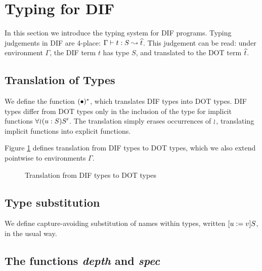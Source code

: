 \section{Typing for DIF}
\label{typing}

In this section we introduce the typing system for DIF programs. Typing
judgements in DIF are 4-place: $\Gamma \vdash t: S \leadsto \widehat{t}$. This judgement can
be read: under environment $\Gamma$, the DIF term $t$ has type $S$, and
translated to the DOT term $\widehat{t}$.

\subsection{Translation of Types}

We define the function $(\bullet)^{*}$, which translates DIF types into DOT types. DIF types differ from DOT types only in the inclusion of the type for implicit functions $\forall\!\wr\!(u:S)S'$. The translation simply erases occurrences of $\wr$, translating implicit functions into explicit functions.
\begin{DEFINITION}
    \label{translation}
    Figure \ref{figure_translation} defines translation from DIF types to DOT
    types, which we also extend pointwise to environments $\Gamma$.
\end{DEFINITION}
\begin{figure}[h]
    \vspace{-5mm}
    
    \caption{Translation from DIF types to DOT types}
    \label{figure_translation}
    \vspace{-3mm}
\end{figure}

\subsection{Type substitution}

\begin{DEFINITION}
    \label{substitution}
    We define capture-avoiding substitution of names within types, written
    $[u := v]S$, in the usual way.
\end{DEFINITION}

\subsection{The functions \textit{depth} and \textit{spec}}

